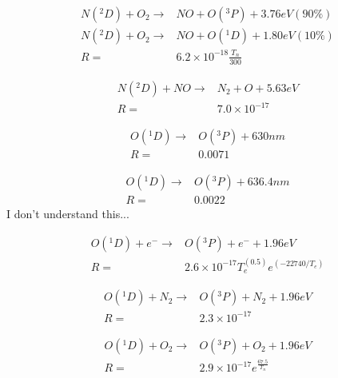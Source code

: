 \documentclass[twoside,10pt]{book}
\begin{document}
\begin{equation}
\begin{split}
N(^2D) + O_2 \rightarrow & NO + O(^3P) + 3.76 eV (90\%)\\
N(^2D) + O_2 \rightarrow & NO + O(^1D) + 1.80 eV (10\%)\\
R = & 6.2 \times 10^{-18} \frac{T_n}{300}
\end{split}
\end{equation}

\begin{equation}
\begin{split}
N(^2D) + NO \rightarrow & N_2 + O + 5.63 eV\\
R = & 7.0 \times 10^{-17}
\end{split}
\end{equation}

\begin{equation}
\begin{split}
O(^1D) \rightarrow & O(^3P) + 630nm\\
R = & 0.0071
\end{split}
\end{equation}

\begin{equation}
\begin{split}
O(^1D) \rightarrow & O(^3P) + 636.4nm\\
R = & 0.0022
\end{split}
\end{equation}
I don't understand this...


\begin{equation}
\begin{split}
O(^1D) + e^- \rightarrow & O(^3P) + e^- + 1.96 eV\\
R = & 2.6 \times 10^{-17} T_e^(0.5)e^(-22740/T_e) 
\end{split}
\end{equation}

\begin{equation}
\begin{split}
O(^1D) + N_2 \rightarrow & O(^3P) + N_2 + 1.96 eV\\
R = & 2.3 \times 10^{-17}
\end{split}
\end{equation}

\begin{equation}
\begin{split}
O(^1D) + O_2 \rightarrow & O(^3P) + O_2 + 1.96 eV\\
R = & 2.9 \times 10^{-17} e^{\frac{67.5}{T_n}}
\end{split}
\end{equation}
\end{document}
